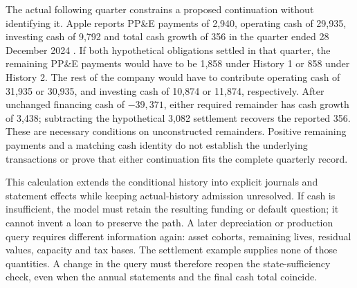 The actual following quarter constrains a proposed continuation without
identifying it. Apple reports PP\&E payments of 2,940, operating cash of
29,935, investing cash of 9,792 and total cash growth of 356 in the quarter
ended 28 December 2024 \citep[printed p.~5]{apple2025q1}. If both
hypothetical obligations settled in that quarter, the remaining PP\&E
payments would have to be 1,858 under History 1 or 858 under History 2.
The rest of the company would have to contribute operating cash of
31,935 or 30,935, and investing cash of 10,874 or 11,874, respectively.
After unchanged financing cash of $-39{,}371$, either required remainder
has cash growth of 3,438; subtracting the hypothetical 3,082 settlement
recovers the reported 356. These are necessary conditions on unconstructed
remainders. Positive remaining payments and a matching cash identity do
not establish the underlying transactions or prove that either
continuation fits the complete quarterly record.

This calculation extends the conditional history into explicit journals
and statement effects while keeping actual-history admission unresolved.
If cash is insufficient, the model must retain the resulting funding or
default question; it cannot invent a loan to preserve the path. A later
depreciation or production query requires different information again:
asset cohorts, remaining lives, residual values, capacity and tax bases.
The settlement example supplies none of those quantities. A change in the
query must therefore reopen the state-sufficiency check, even when the
annual statements and the final cash total coincide.
